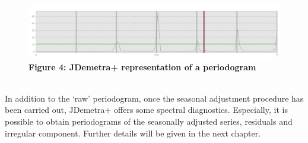 \documentclass{article}
\begin{document}
\begin{figure}[h!]
\includegraphics[width=\linewidth]{../images/capitolo2/raw.jpg}
\centering
{\textbf{\scriptsize Figure 4: JDemetra+ representation of a periodogram}}
\end{figure}
\\In addition to the ‘raw’ periodogram, once the seasonal adjustment procedure has been carried out, JDemetra+ offers some spectral diagnostics. Especially, it is possible to obtain periodograms of the seasonally adjusted series, residuals and irregular component. Further details will be given in the next chapter.
\end{document}
